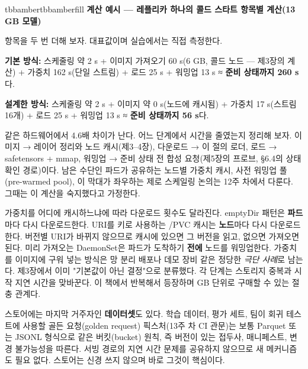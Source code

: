\begin{calloutbox}{tbbamber}{tbbamberfill}
{\normalsize\bfseries\color{tbbamberdark}계산 예시 — 레플리카 하나의 콜드 스타트 항목별 계산(13 GB 모델)}\par\vspace{3pt}
항목을 두 번 더해 보자. 대표값이며 실습에서는 직접 측정한다.

\begin{tbbitemize}
  \item \textbf{기본 방식:} 스케줄링 약 2 s + 이미지 가져오기 60 s(6 GB, 콜드 노드 — 제3장의 계산) + 가중치 162 s(단일 스트림) + 로드 25 s + 워밍업 13 s ≈ \textbf{준비 상태까지 260 s}다.
  \item \textbf{설계한 방식:} 스케줄링 약 2 s + 이미지 약 0 s(노드에 캐시됨) + 가중치 17 s(스트림 16개) + 로드 25 s + 워밍업 13 s ≈ \textbf{준비 상태까지 56 s}다.
\end{tbbitemize}

같은 하드웨어에서 4.6배 차이가 난다. 어느 단계에서 시간을 줄였는지 정리해 보자. 이미지 → 레이어 정리와 노드 캐시(제3–4장), 다운로드 → 이 절의 로더, 로드 → safetensors + mmap, 워밍업 → 준비 상태 전 합성 요청(제5장의 프로브, §6.4의 상태 확인 경로)이다. 남은 수단인 파드가 공유하는 노드별 가중치 캐시, 사전 워밍업 풀(pre-warmed pool), 이 막대가 좌우하는 제로 스케일링 논의는 12주 차에서 다룬다. 그때는 이 계산을 숙지했다고 가정한다.
\end{calloutbox}

\vspace{3.0pt}

가중치를 어디에 캐시하느냐에 따라 다운로드 횟수도 달라진다. emptyDir 패턴은 \textbf{파드}마다 다시 다운로드한다. URI를 키로 사용하는 /PVC 캐시는 \textbf{노드}마다 다시 다운로드한다. 버전별 URI가 바뀌지 않으므로 캐시에 있으면 그 버전을 읽고, 없으면 가져오면 된다. 미리 가져오는 DaemonSet은 파드가 도착하기 \textbf{전에} 노드를 워밍업한다. 가중치를 이미지에 구워 넣는 방식은 망 분리 배포나 데모 장비 같은 정당한 \textit{극단 사례}로 남는다. 제3장에서 이미 "기본값이 아닌 결정"으로 분류했다. 각 단계는 스토리지 중복과 시작 지연 시간을 맞바꾼다. 이 책에서 반복해서 등장하며 GB 단위로 구매할 수 있는 절충 관계다.

스토어에는 마지막 거주자인 \textbf{데이터셋}도 있다. 학습 데이터, 평가 세트, 팀이 회귀 테스트에 사용할 골든 요청(golden request) 픽스처(13주 차 CI 관문)는 보통 Parquet 또는 JSONL 형식으로 같은 버킷(bucket) 원칙, 즉 버전이 있는 접두사, 매니페스트, 변경 불가능성을 따른다. 서빙 경로의 지연 시간 문제를 공유하지 않으므로 새 메커니즘도 필요 없다. 스토어는 신경 쓰지 않으며 바로 그것이 핵심이다.

